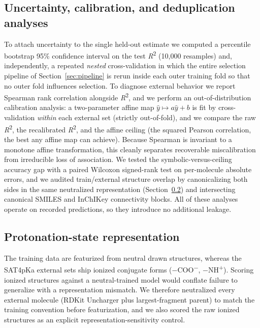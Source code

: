 \documentclass[11pt]{article}
\newcommand{\rtwo}{\textit{R}\textsuperscript{2}}
\begin{document}
\subsection{Uncertainty, calibration, and deduplication analyses}
\label{sec:analyses}

To attach uncertainty to the single held-out estimate we computed a percentile bootstrap
95\% confidence interval on the test \rtwo{} (10{,}000 resamples) and, independently, a repeated
\emph{nested} cross-validation in which the entire selection pipeline of
Section~\ref{sec:pipeline} is rerun inside each outer training fold so that no outer fold
influences selection. To diagnose external behavior we report Spearman rank correlation
alongside \rtwo{}, and we perform an out-of-distribution calibration analysis: a two-parameter
affine map $\hat{y}\mapsto a\hat{y}+b$ is fit by cross-validation \emph{within} each external set
(strictly out-of-fold), and we compare the raw \rtwo{}, the recalibrated \rtwo{}, and the affine
ceiling (the squared Pearson correlation, the best any affine map can achieve). Because Spearman
is invariant to a monotone affine transformation, this cleanly separates recoverable
miscalibration from irreducible loss of association. We tested the symbolic-versus-ceiling
accuracy gap with a paired Wilcoxon signed-rank test on per-molecule absolute errors, and we
audited train/external structure overlap by canonicalizing both sides in the same neutralized
representation (Section~\ref{sec:repr}) and intersecting canonical SMILES and InChIKey
connectivity blocks. All of these analyses operate on recorded predictions, so they introduce
no additional leakage.

\subsection{Protonation-state representation}
\label{sec:repr}

The training data are featurized from neutral drawn structures, whereas the SAT4pKa external sets
ship ionized conjugate forms ($-$COO\textsuperscript{$-$}, $-$NH\textsuperscript{$+$}). Scoring
ionized structures against a neutral-trained model would conflate failure to generalize with a
representation mismatch. We therefore neutralized every external molecule (RDKit Uncharger plus
largest-fragment parent) to match the training convention before featurization, and we also
scored the raw ionized structures as an explicit representation-sensitivity control.

\end{document}
